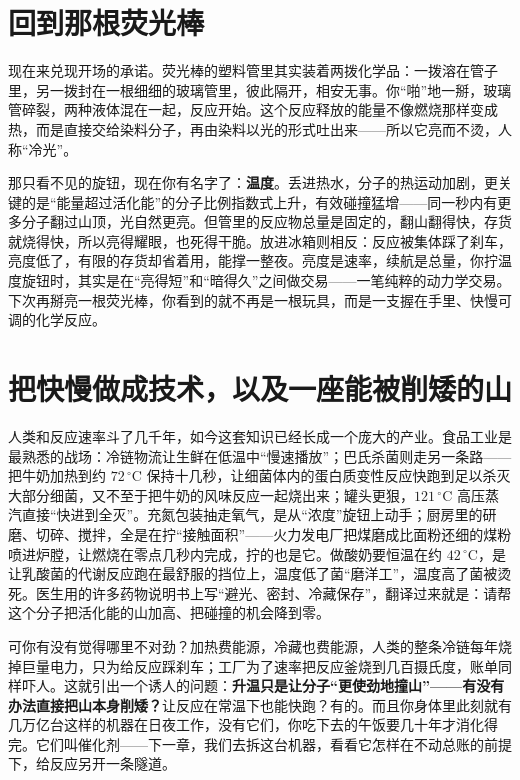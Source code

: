 \section{回到那根荧光棒}

现在来兑现开场的承诺。荧光棒的塑料管里其实装着两拨化学品：一拨溶在管子里，另一拨封在一根细细的玻璃管里，彼此隔开，相安无事。你“啪”地一掰，玻璃管碎裂，两种液体混在一起，反应开始。这个反应释放的能量不像燃烧那样变成热，而是直接交给染料分子，再由染料以光的形式吐出来——所以它亮而不烫，人称“冷光”。

那只看不见的旋钮，现在你有名字了：\textbf{温度}。丢进热水，分子的热运动加剧，更关键的是“能量超过活化能”的分子比例指数式上升，有效碰撞猛增——同一秒内有更多分子翻过山顶，光自然更亮。但管里的反应物总量是固定的，翻山翻得快，存货就烧得快，所以亮得耀眼，也死得干脆。放进冰箱则相反：反应被集体踩了刹车，亮度低了，有限的存货却省着用，能撑一整夜。亮度是速率，续航是总量，你拧温度旋钮时，其实是在“亮得短”和“暗得久”之间做交易——一笔纯粹的动力学交易。下次再掰亮一根荧光棒，你看到的就不再是一根玩具，而是一支握在手里、快慢可调的化学反应。

\section{把快慢做成技术，以及一座能被削矮的山}

人类和反应速率斗了几千年，如今这套知识已经长成一个庞大的产业。食品工业是最熟悉的战场：冷链物流让生鲜在低温中“慢速播放”；巴氏杀菌则走另一条路——把牛奶加热到约 $72\,^{\circ}\mathrm{C}$ 保持十几秒，让细菌体内的蛋白质变性反应快跑到足以杀灭大部分细菌，又不至于把牛奶的风味反应一起烧出来；罐头更狠，$121\,^{\circ}\mathrm{C}$ 高压蒸汽直接“快进到全灭”。充氮包装抽走氧气，是从“浓度”旋钮上动手；厨房里的研磨、切碎、搅拌，全是在拧“接触面积”——火力发电厂把煤磨成比面粉还细的煤粉喷进炉膛，让燃烧在零点几秒内完成，拧的也是它。做酸奶要恒温在约 $42\,^{\circ}\mathrm{C}$，是让乳酸菌的代谢反应跑在最舒服的挡位上，温度低了菌“磨洋工”，温度高了菌被烫死。医生用的许多药物说明书上写“避光、密封、冷藏保存”，翻译过来就是：请帮这个分子把活化能的山加高、把碰撞的机会降到零。

可你有没有觉得哪里不对劲？加热费能源，冷藏也费能源，人类的整条冷链每年烧掉巨量电力，只为给反应踩刹车；工厂为了速率把反应釜烧到几百摄氏度，账单同样吓人。这就引出一个诱人的问题：\textbf{升温只是让分子“更使劲地撞山”——有没有办法直接把山本身削矮？}让反应在常温下也能快跑？有的。而且你身体里此刻就有几万亿台这样的机器在日夜工作，没有它们，你吃下去的午饭要几十年才消化得完。它们叫催化剂——下一章，我们去拆这台机器，看看它怎样在不动总账的前提下，给反应另开一条隧道。

